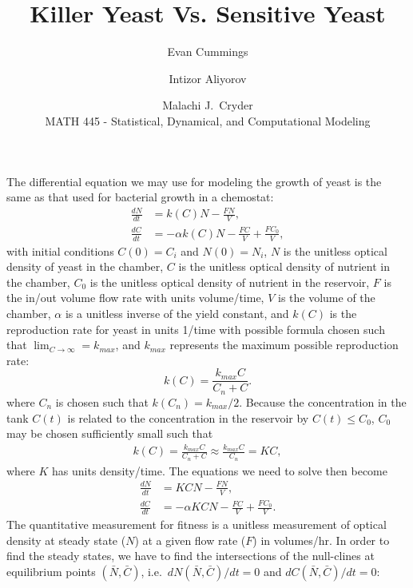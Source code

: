 


\small

\title{Killer Yeast Vs. Sensitive Yeast}
\author{Evan Cummings \and Intizor Aliyorov \and Malachi J.\ Cryder\\
MATH 445 - Statistical, Dynamical, and Computational Modeling}

\maketitle

The differential equation we may use for modeling the growth of yeast is the same as that used for bacterial growth in a chemostat:
\begin{align*}
  \frac{dN}{dt} &= k(C) N - \frac{FN}{V}, \\
  \frac{dC}{dt} &= -\alpha k(C) N - \frac{FC}{V} + \frac{FC_0}{V},
\end{align*}
with initial conditions $C(0) = C_i$ and $N(0) = N_i$, $N$ is the unitless optical density of yeast in the chamber, $C$ is the unitless optical density of nutrient in the chamber, $C_0$ is the unitless optical density of nutrient in the reservoir, $F$ is the in/out volume flow rate with units volume/time, $V$ is the volume of the chamber, $\alpha$ is a unitless inverse of the yield constant, and $k(C)$ is the reproduction rate for yeast in units 1/time with possible formula chosen such that $\lim_{C \rightarrow \infty} = k_{max}$, and $k_{max}$ represents the maximum possible reproduction rate:
$$k(C) = \frac{k_{max} C}{C_n + C}.$$
where $C_n$ is chosen such that $k(C_n) = k_{max} / 2$.  Because the concentration in the tank $C(t)$ is related to the concentration in the reservoir by $C(t) \leq C_0$, $C_0$ may be chosen sufficiently small such that 
\begin{align*}
  k(C) = \frac{k_{max} C}{C_n + C} \approx \frac{k_{max} C}{C_n} = KC,
\end{align*}
where $K$ has units density/time. The equations we need to solve then become 
\begin{align}
  \frac{dN}{dt} &= KCN - \frac{FN}{V}, \\
  \frac{dC}{dt} &= -\alpha KCN - \frac{FC}{V} + \frac{FC_0}{V}.
\end{align}
The quantitative measurement for fitness is a unitless measurement of optical density at steady state ($N$) at a given flow rate ($F$) in volumes/hr.  In order to find the steady states, we have to find the intersections of the null-clines at equilibrium points $(\bar{N}, \bar{C})$, i.e.\ $dN(\bar{N},\bar{C})/dt = 0$ and $dC(\bar{N},\bar{C})/dt = 0$:

